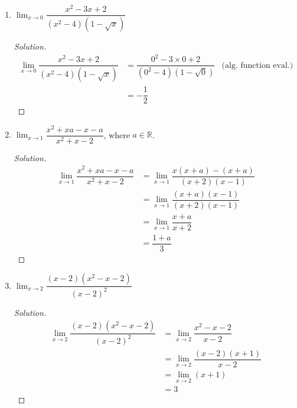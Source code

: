 \documentclass[12pt]{article}
\newenvironment{solution}{\begin{proof}[Solution]}{\end{proof}}
\begin{document}
\begin{enumerate}
\begin{enumerate}
\begin{solution}
\begin{align*}
					&= \dfrac{(1-2)(1+\sqrt{1})}{-(1^2-4)} & \text{(alg. function eval.)}\\
					&= -\dfrac{2}{3}
				\end{align*}
			\end{solution}
			\item $\displaystyle{\lim_{x \to 0} \dfrac{x^2-3x+2}{(x^2-4)(1-\sqrt{x})}}$
			\begin{solution}
				\begin{align*}
					\displaystyle{\lim_{x \to 0} \dfrac{x^2-3x+2}{(x^2-4)(1-\sqrt{x})}}
					&= \dfrac{0^2-3\times 0 +2}{(0^2-4)(1-\sqrt{0})} & \text{(alg. function eval.)}\\
					&= -\dfrac{1}{2}
				\end{align*}
			\end{solution}
			\item $\displaystyle{\lim_{x\to1} \dfrac{x^2+xa-x-a}{x^2+x-2}}$, where $a\in\mathbb{R}$.
			\begin{solution}
				\begin{align*}
					\displaystyle{\lim_{x\to1} \dfrac{x^2+xa-x-a}{x^2+x-2}}&=\displaystyle{\lim_{x\to1} \dfrac{x(x+a)-(x+a)}{(x+2)(x-1)}}\\
					&=\displaystyle{\lim_{x\to1} \dfrac{(x+a)(x-1)}{(x+2)(x-1)}}\\
					&=\displaystyle{\lim_{x\to1} \dfrac{x+a}{x+2}}\\
					&=\dfrac{1+a}{3}
				\end{align*}
				
			\end{solution}
			\item $\displaystyle{\lim_{x\to 2} \dfrac{(x-2)(x^2-x-2)}{(x-2)^2}}$
			\begin{solution}
				\begin{align*}
					\displaystyle{\lim_{x\to 2} \dfrac{(x-2)(x^2-x-2)}{(x-2)^2}}&=\displaystyle{\lim_{x\to 2} \dfrac{x^2-x-2}{x-2}}\\
					&=\displaystyle{\lim_{x\to 2} \dfrac{(x-2)(x+1)}{x-2}}\\
					&=\displaystyle{\lim_{x\to 2} (x+1)}\\
					&=3
				\end{align*}
			\end{solution}
			
		\end{enumerate}
		\end{enumerate}
		
\end{document}
